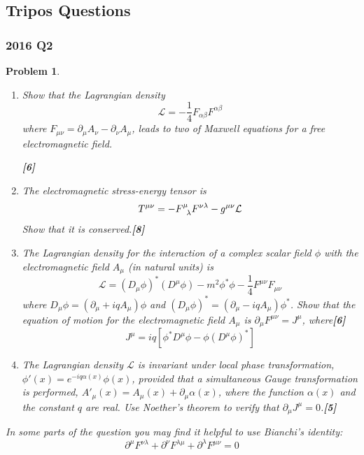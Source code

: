 \documentclass[a4paper]{article}
\theoremstyle{new}
\newtheorem{qns}{Problem}[section]
\begin{document}
\subsection{Tripos Questions}
\subsubsection*{2016 Q2}
\begin{qns}\leavevmode
\begin{enumerate}[label=(\alph*)]
\item Show that the Lagrangian density
$$\mathcal{L}=-\frac{1}{4}F_{\alpha\beta}F^{\alpha\beta}$$
where $F_{\mu\nu}=\partial_\mu A_\nu-\partial_\nu A_\mu$, leads to two of Maxwell equations for a free electromagnetic field.

\hfill\textbf{[6]}
\item The electromagnetic stress-energy tensor is
$$T^{\mu\nu}=-\tensor*{F}{*_{}^{\mu}_{\lambda}}F^{\nu\lambda}-g^{\mu\nu}\mathcal{L}$$
Show that it is conserved.\hfill\textbf{[8]}
\item The Lagrangian density for the interaction of a complex scalar field $\phi$ with the electromagnetic field $A_\mu$ (in natural units) is
$$\mathcal{L}=(D_\mu\phi)^*(D^\mu\phi)-m^2\phi^*\phi-\frac{1}{4}F^{\mu\nu}F_{\mu\nu}$$
where $D_\mu\phi=(\partial_\mu+iqA_\mu)\phi$ and $(D_\mu\phi)^*=(\partial_\mu-iqA_\mu)\phi^*$. Show that the equation of motion for the electromagnetic field $A_\mu$ is $\partial_\mu F^{\mu\nu}=J^\mu$, where\hfill\textbf{[6]}
$$J^\mu=iq[\phi^*D^\mu\phi-\phi(D^\mu\phi)^*]$$
\item The Lagrangian density $\mathcal{L}$ is invariant under local phase transformation, $\phi'(x)=e^{-iq\alpha(x)}\phi(x)$, provided that a simultaneous Gauge transformation is performed, $A'_\mu(x)=A_\mu(x)+\partial_\mu\alpha(x)$, where the function $\alpha(x)$ and the constant $q$ are real. Use Noether's theorem to verify that $\partial_\mu J^\mu=0$.\hfill\textbf{[5]}
\end{enumerate}
In some parts of the question you may find it helpful to use Bianchi's identity:
$$\partial^\mu F^{\nu\lambda}+\partial^\nu F^{\lambda\mu}+\partial^\lambda F^{\mu\nu}=0$$
\end{qns}
\end{document}

